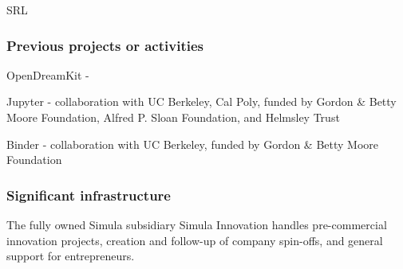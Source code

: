 \begin{sitedescription}{SRL}
\subsubsection*{Previous projects or activities}

\begin{compactenum}
\item OpenDreamKit -
\item Jupyter - collaboration with UC Berkeley, Cal Poly, funded by Gordon \& Betty Moore Foundation,
      Alfred P. Sloan Foundation, and Helmsley Trust
\item Binder - collaboration with UC Berkeley, funded by Gordon \& Betty Moore Foundation
\end{compactenum}

\subsubsection*{Significant infrastructure}

The fully owned Simula subsidiary Simula Innovation handles pre-commercial innovation projects, creation and follow-up of company spin-offs, and general support for entrepreneurs.

\end{sitedescription}






